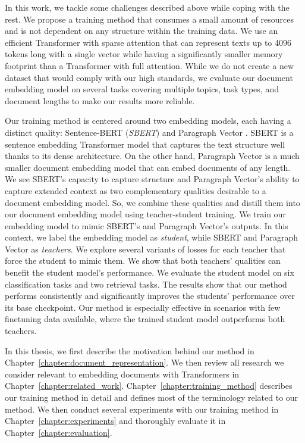 In this work, we tackle some challenges described above while coping with the
rest. We propose a training method that consumes a small amount of resources
and is not dependent on any structure within the training data. We use an
efficient Transformer with sparse attention that can represent texts up to 4096
tokens long with a single vector while having a significantly smaller memory
footprint than a Transformer with full attention. While we do not create a new
dataset that would comply with our high standards, we evaluate our document
embedding model on several tasks covering multiple topics, task types, and
document lengths to make our results more reliable.

Our training method is centered around two embedding models, each having a
distinct quality: Sentence-BERT (\emph{SBERT}) \citep{reimers2019sentence} and
Paragraph Vector \citep{le2014distributed}. SBERT is a sentence embedding
Transformer model that captures the text structure well thanks to its dense
architecture. On the other hand, Paragraph Vector is a much smaller document
embedding model that can embed documents of any length. We see SBERT's capacity
to capture structure and Paragraph Vector's ability to capture extended context
as two complementary qualities desirable to a document embedding model. So, we
combine these qualities and distill them into our document embedding model
using teacher-student training. We train our embedding model to mimic SBERT's
and Paragraph Vector's outputs. In this context, we label the embedding model
as \emph{student}, while SBERT and Paragraph Vector as \emph{teachers}. We
explore several variants of losses for each teacher that force the student to
mimic them. We show that both teachers' qualities can benefit the student
model's performance. We evaluate the student model on six classification tasks
and two retrieval tasks. The results show that our method performs consistently
and significantly improves the students' performance over its base checkpoint.
Our method is especially effective in scenarios with few finetuning data
available, where the trained student model outperforms both teachers.

In this thesis, we first describe the motivation behind our method in
Chapter~\ref{chapter:document_representation}. We then review all research we
consider relevant to embedding documents with Transformers in
Chapter~\ref{chapter:related_work}. Chapter~\ref{chapter:training_method}
describes our training method in detail and defines most of the terminology
related to our method. We then conduct several experiments with our training
method in Chapter~\ref{chapter:experiments} and thoroughly evaluate it in
Chapter~\ref{chapter:evaluation}.
